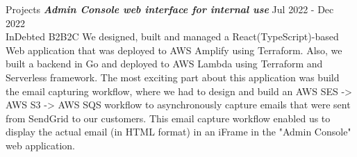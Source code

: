 \begin{section}{Projects}
    {\textsl \textbf{Admin Console web interface for internal use}} \hfill Jul 2022 - Dec 2022 \\ InDebted \hfill B2B2C
    We designed, built and managed a React(TypeScript)-based Web application that was deployed to AWS Amplify using Terraform. Also, we built a backend in Go and deployed to AWS Lambda using Terraform and Serverless framework. The most exciting part about this application was build the email capturing workflow, where we had to design and build an AWS SES -> AWS S3 -> AWS SQS workflow to asynchronously capture emails that were sent from SendGrid to our customers. This email capture workflow enabled us to display the actual email (in HTML format) in an iFrame in the "Admin Console" web application.
    
  \end{section}
  